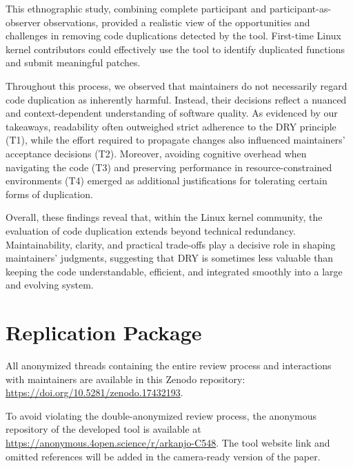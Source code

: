 \documentclass[10pt,conference]{IEEEtran}
\begin{document}
This ethnographic study, combining complete participant and participant-as-observer observations, provided a realistic view of the opportunities and challenges in removing code duplications detected by the tool. First-time Linux kernel contributors could effectively use the tool to identify duplicated functions and submit meaningful patches.

Throughout this process, we observed that maintainers do not necessarily regard code duplication as inherently harmful. Instead, their decisions reflect a nuanced and context-dependent understanding of software quality. As evidenced by our takeaways, readability often outweighed strict adherence to the DRY principle (T1), while the effort required to propagate changes also influenced maintainers’ acceptance decisions (T2). Moreover, avoiding cognitive overhead when navigating the code (T3) and preserving performance in resource-constrained environments (T4) emerged as additional justifications for tolerating certain forms of duplication.

Overall, these findings reveal that, within the Linux kernel community, the evaluation of code duplication extends beyond technical redundancy. Maintainability, clarity, and practical trade-offs play a decisive role in shaping maintainers’ judgments, suggesting that DRY is sometimes less valuable than keeping the code understandable, efficient, and integrated smoothly into a large and evolving system.

\section*{Replication Package}

All anonymized threads containing the entire review process and interactions with maintainers are available in this Zenodo repository: \href{https://doi.org/10.5281/zenodo.17432193}{https://doi.org/10.5281/zenodo.17432193}.

To avoid violating the double-anonymized review process, the anonymous repository of the developed tool is available at \url{https://anonymous.4open.science/r/arkanjo-C548}. The tool website link and omitted references will be added in the camera-ready version of the paper.



\end{document}
